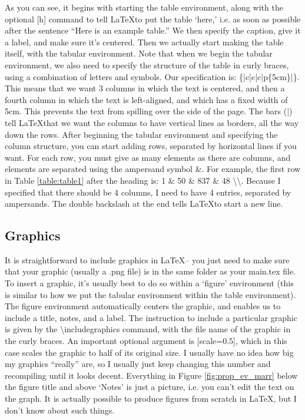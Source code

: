 \documentclass[11pt]{article}
\begin{document}
As you can see, it begins with starting the table environment, along with the optional [h] command to tell \LaTeX to put the table `here,' i.e. as soon as possible after the sentence ``Here is an example table.'' We then specify the caption, give it a label, and make sure it's centered. Then we actually start making the table itself, with the tabular environment. Note that when we begin the tabular environment, we also need to specify the structure of the table in curly braces, using a combination of letters and symbols. Our specification is: \{|c|c|c|p\{5cm\}|\}. This means that we want 3 columns in which the text is centered, and then a fourth column in which the text is left-aligned, and which has a fixed width of 5cm. This prevents the text from spilling over the side of the page. The bars (|) tell \LaTeX that we want the columns to have vertical lines as borders, all the way down the rows. After beginning the tabular environment and specifying the column structure, you can start adding rows, separated by horizontal lines if you want. For each row, you must give as many elements as there are columns, and elements are separated using the ampersand symbol \&. For example, the first row in Table \ref{table:table1} after the heading is: 1 \& 50 \& 837 \& 48 \textbackslash \textbackslash. Because I specified that there should be 4 columns, I need to have 4 entries, separated by ampersands. The double backslash at the end tells \LaTeX to start a new line.

\subsection{Graphics}

It is straightforward to include graphics in \LaTeX -- you just need to make sure that your graphic (usually a .png file) is in the same folder as your main.tex file. To insert a graphic, it's usually best to do so within a `figure' environment (this is similar to how we put the tabular environment within the table environment). The figure environment automatically centers the graphic, and enables us to include a title, notes, and a label. The instruction to include a particular graphic is given by the \textbackslash includegraphics{} command, with the file name of the graphic in the curly braces. An important optional argument is [scale=0.5], which in this case scales the graphic to half of its original size. I usually have no idea how big my graphics ``really'' are, so I usually just keep changing this number and recompiling until it looks decent. Everything in Figure \ref{fig:prop_ev_marr} below the figure title and above `Notes' is just a picture, i.e. you can't edit the text on the graph. It is actually possible to produce figures from scratch in \LaTeX, but I don't know about such things.
\end{document}
